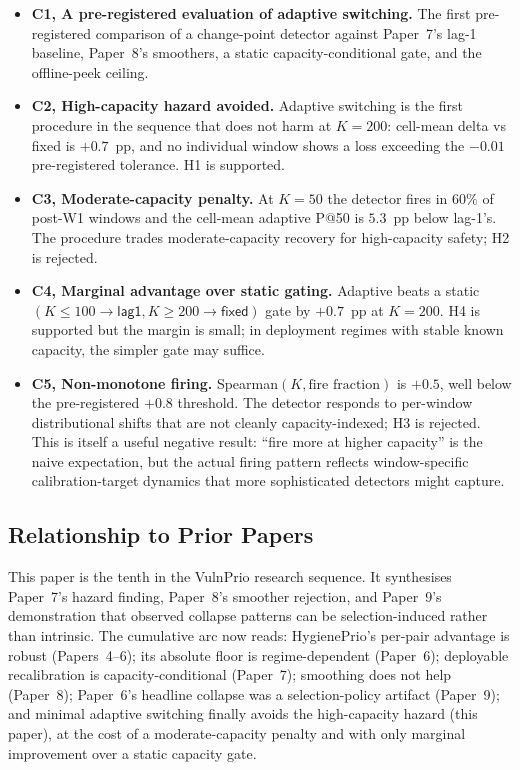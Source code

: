 \begin{itemize}
\item \textbf{C1, A pre-registered evaluation of adaptive
switching.} The first pre-registered comparison of a change-point
detector against Paper~7's lag-1 baseline, Paper~8's smoothers, a
static capacity-conditional gate, and the offline-peek ceiling.

\item \textbf{C2, High-capacity hazard avoided.} Adaptive
switching is the first procedure in the sequence that does not harm
at $K = 200$: cell-mean delta vs \textsf{fixed} is $+0.7$~pp, and
no individual window shows a loss exceeding the $-0.01$ pre-registered
tolerance. H1 is supported.

\item \textbf{C3, Moderate-capacity penalty.} At $K = 50$ the
detector fires in $60\%$ of post-W1 windows and the cell-mean adaptive
P@50 is $5.3$~pp below lag-1's. The procedure trades moderate-capacity
recovery for high-capacity safety; H2 is rejected.

\item \textbf{C4, Marginal advantage over static gating.} Adaptive
beats a static $(K \leq 100 \to \textsf{lag1}, K \geq 200 \to
\textsf{fixed})$ gate by $+0.7$~pp at $K = 200$. H4 is supported but
the margin is small; in deployment regimes with stable known
capacity, the simpler gate may suffice.

\item \textbf{C5, Non-monotone firing.} Spearman$(K, \text{fire
fraction})$ is $+0.5$, well below the pre-registered $+0.8$
threshold. The detector responds to per-window distributional shifts
that are not cleanly capacity-indexed; H3 is rejected. This is itself
a useful negative result: ``fire more at higher capacity'' is the
naive expectation, but the actual firing pattern reflects
window-specific calibration-target dynamics that more sophisticated
detectors might capture.
\end{itemize}

\subsection{Relationship to Prior Papers}

This paper is the tenth in the VulnPrio research sequence. It
synthesises Paper~7's hazard finding, Paper~8's smoother rejection,
and Paper~9's~\cite{paper9selftraj} demonstration that observed
collapse patterns can be selection-induced rather than intrinsic.
The cumulative arc now reads: HygienePrio's per-pair advantage is
robust (Papers~4--6); its absolute floor is regime-dependent (Paper~6);
deployable recalibration is capacity-conditional (Paper~7); smoothing
does not help (Paper~8); Paper~6's headline collapse was a
selection-policy artifact (Paper~9); and minimal adaptive switching
finally avoids the high-capacity hazard (this paper), at the cost
of a moderate-capacity penalty and with only marginal improvement
over a static capacity gate.
